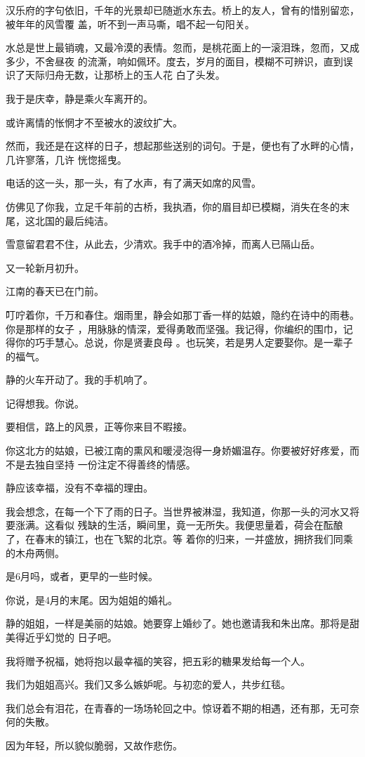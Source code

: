\documentclass[12pt,a4paper]{article}
\begin{document}
		汉乐府的字句依旧，千年的光景却已随逝水东去。桥上的友人，曾有的惜别留恋，被年年的风雪覆
	盖，听不到一声马嘶，唱不起一句阳关。

		水总是世上最销魂，又最冷漠的表情。忽而，是桃花面上的一滚泪珠，忽而，又成多少，不舍昼夜
	的流澌，响如佩环。度去，岁月的面目，模糊不可辨识，直到误识了天际归舟无数，让那桥上的玉人花
	白了头发。

		我于是庆幸，静是乘火车离开的。\par
		或许离情的怅惘才不至被水的波纹扩大。

		然而，我还是在这样的日子，想起那些送别的词句。于是，便也有了水畔的心情，几许寥落，几许
	恍惚摇曳。

		电话的这一头，那一头，有了水声，有了满天如席的风雪。\par
		仿佛见了你我，立足千年前的古桥，我执酒，你的眉目却已模糊，消失在冬的末尾，这北国的最后纯洁。\par
		雪意留君君不住，从此去，少清欢。我手中的酒冷掉，而离人已隔山岳。\par
		又一轮新月初升。


		江南的春天已在门前。

		叮咛着你，千万和春住。烟雨里，静会如那丁香一样的姑娘，隐约在诗中的雨巷。你是那样的女子
	，用脉脉的情深，爱得勇敢而坚强。我记得，你编织的围巾，记得你的巧手慧心。总说，你是贤妻良母
	。也玩笑，若是男人定要娶你。是一辈子的福气。

		静的火车开动了。我的手机响了。

		记得想我。你说。

		要相信，路上的风景，正等你来目不暇接。

		你这北方的姑娘，已被江南的熏风和暖浸泡得一身娇媚温存。你要被好好疼爱，而不是去独自坚持
	一份注定不得善终的情感。

		静应该幸福，没有不幸福的理由。

		我会想念，在每一个下了雨的日子。当世界被淋湿，我知道，你那一头的河水又将要涨满。这看似
	残缺的生活，瞬间里，竟一无所失。我便思量着，荷会在酝酿了，在春末的镇江，也在飞絮的北京。等
	着你的归来，一并盛放，拥挤我们同乘的木舟两侧。

		是6月吗，或者，更早的一些时候。

		你说，是4月的末尾。因为姐姐的婚礼。

		静的姐姐，一样是美丽的姑娘。她要穿上婚纱了。她也邀请我和朱出席。那将是甜美得近乎幻觉的
	日子吧。

		我将赠予祝福，她将抱以最幸福的笑容，把五彩的糖果发给每一个人。\par
		我们为姐姐高兴。我们又多么嫉妒呢。与初恋的爱人，共步红毯。\par
		我们总会有泪花，在青春的一场场轮回之中。惊讶着不期的相遇，还有那，无可奈何的失散。\par
		因为年轻，所以貌似脆弱，又故作悲伤。
\end{document}

